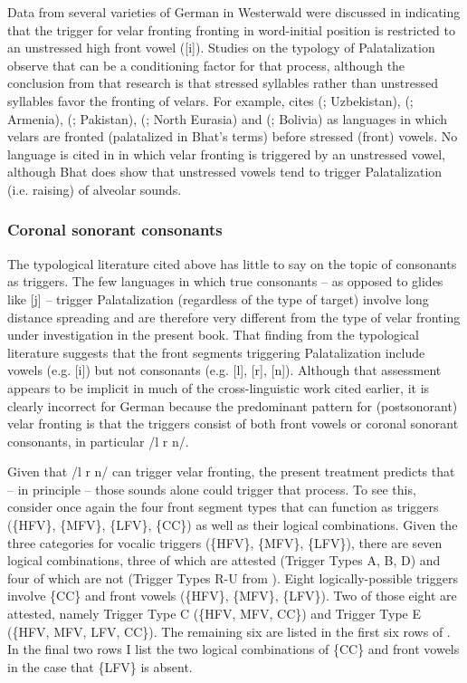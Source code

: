 Data from several varieties of German in Westerwald were discussed in  indicating that the trigger for velar fronting fronting in word-initial position is restricted to an unstressed high front vowel ([i]). Studies on the typology of Palatalization observe that  can be a conditioning factor for that process, although the conclusion from that research is that stressed syllables rather than unstressed syllables favor the fronting of velars. For example, \citet[55]{Bhat1978} cites  (; Uzbekistan),  (; Armenia),  (; Pakistan),  (; North Eurasia) and  (; Bolivia) as languages in which velars are fronted (palatalized in Bhat's terms) before stressed (front) vowels. No language is cited in \citet{Bhat1978} in which velar fronting is triggered by an unstressed vowel, although Bhat does show that unstressed vowels tend to trigger Palatalization (i.e. raising) of alveolar sounds.

\subsubsection{Coronal sonorant consonants}
The typological literature cited above has little to say on the topic of consonants as triggers. The few languages in which true consonants -- as opposed to glides like [j] -- trigger Palatalization (regardless of the type of target) involve long distance spreading and are therefore very different from the type of velar fronting under investigation in the present book. That finding from the typological literature suggests that the front segments triggering Palatalization include vowels (e.g. [i]) but not consonants (e.g. [l], [r], [n]). Although that assessment appears to be implicit in much of the cross-linguistic work cited earlier, it is clearly incorrect for German because the predominant pattern for (postsonorant) velar fronting is that the triggers consist of both front vowels or coronal sonorant consonants, in particular /l r n/.


Given that /l r n/ can trigger velar fronting, the present treatment predicts that -- in principle -- those sounds alone could trigger that process. To see this, consider once again the four front segment types that can function as triggers (\{HFV\}, \{MFV\}, \{LFV\}, \{CC\}) as well as their logical combinations. Given the three categories for vocalic triggers (\{HFV\}, \{MFV\}, \{LFV\}), there are seven logical combinations, three of which are attested (Trigger Types A, B, D) and four of which are not (Trigger Types R-U from ). Eight logically-possible triggers involve \{CC\} and front vowels (\{HFV\}, \{MFV\}, \{LFV\}). Two of those eight are attested, namely Trigger Type C (\{HFV, MFV, CC\}) and Trigger Type E (\{HFV, MFV, LFV, CC\}). The remaining six are listed in the first six rows of . In the final two rows I list the two logical combinations of \{CC\} and front vowels in the case that \{LFV\} is absent.

